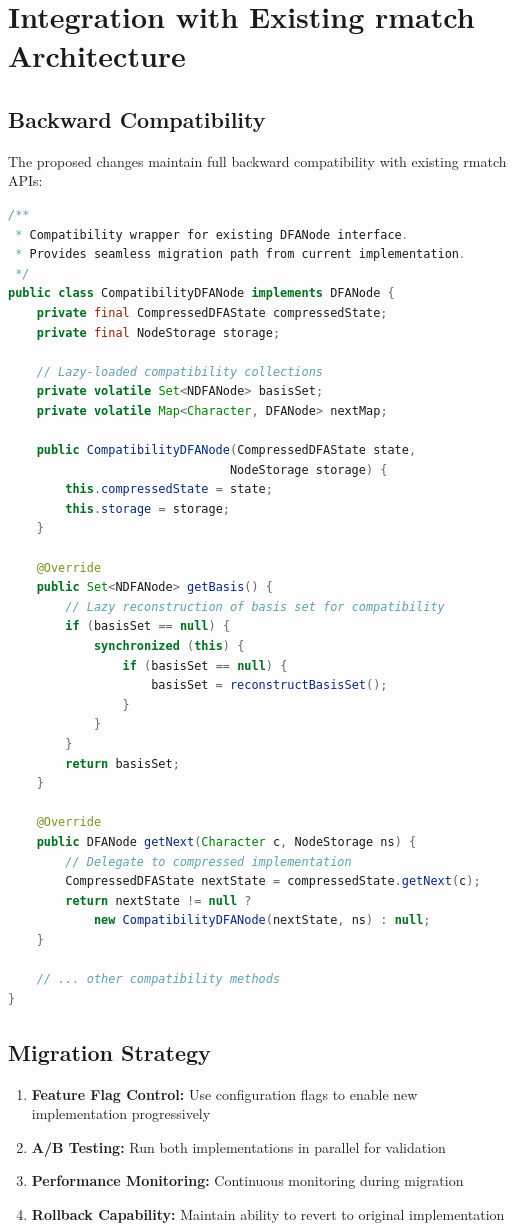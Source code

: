 \documentclass[11pt,a4paper]{article}
\begin{document}
\section{Integration with Existing rmatch Architecture}

\subsection{Backward Compatibility}

The proposed changes maintain full backward compatibility with existing rmatch APIs:

\begin{lstlisting}[language=Java,caption={Compatibility Layer Implementation}]
/**
 * Compatibility wrapper for existing DFANode interface.
 * Provides seamless migration path from current implementation.
 */
public class CompatibilityDFANode implements DFANode {
    private final CompressedDFAState compressedState;
    private final NodeStorage storage;
    
    // Lazy-loaded compatibility collections
    private volatile Set<NDFANode> basisSet;
    private volatile Map<Character, DFANode> nextMap;
    
    public CompatibilityDFANode(CompressedDFAState state, 
                               NodeStorage storage) {
        this.compressedState = state;
        this.storage = storage;
    }
    
    @Override
    public Set<NDFANode> getBasis() {
        // Lazy reconstruction of basis set for compatibility
        if (basisSet == null) {
            synchronized (this) {
                if (basisSet == null) {
                    basisSet = reconstructBasisSet();
                }
            }
        }
        return basisSet;
    }
    
    @Override
    public DFANode getNext(Character c, NodeStorage ns) {
        // Delegate to compressed implementation
        CompressedDFAState nextState = compressedState.getNext(c);
        return nextState != null ? 
            new CompatibilityDFANode(nextState, ns) : null;
    }
    
    // ... other compatibility methods
}
\end{lstlisting}

\subsection{Migration Strategy}

\begin{enumerate}
    \item \textbf{Feature Flag Control:} Use configuration flags to enable new implementation progressively
    \item \textbf{A/B Testing:} Run both implementations in parallel for validation
    \item \textbf{Performance Monitoring:} Continuous monitoring during migration
    \item \textbf{Rollback Capability:} Maintain ability to revert to original implementation
\end{enumerate}
\end{document}
